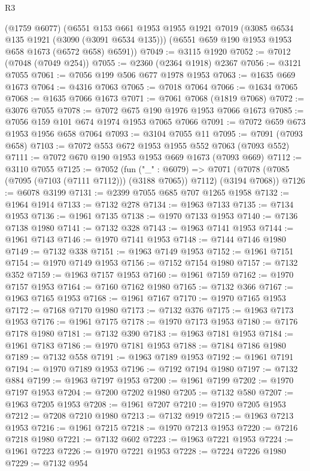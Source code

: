 \begin{lexlean}{R3}
\begin{coremodule}
    (@1759 @6077)
    (@6551
      @153
      @661
      @1953
      @1955
      @1921
      @7019
      (@3085 @6534 @135 @1921 (@3090 (@3091 @6534 @135)))
      (@6551 @659 @190 @1953 @1953 @658 @1673 (@6572 @658) @6591))
@7049 := @3115 @1920
@7052 := @7012 (@7048 (@7049 @254))
@7055 := @2360 (@2364 @1918) @2367
@7056 := @3121 @7055
@7061 := @7056 @199 @506 @677 @1978 @1953
@7063 := @1635 @669 @1673
@7064 := @4316 @7063
@7065 := @7018 @7064
@7066 := @1634 @7065
@7068 := @1635 @7066 @1673
@7071 := @7061 @7068 (@1819 @7068)
@7072 := @3076 @7055
@7078 := @7072 @675 @190 @1976 @1953 @7066 @1673
@7085 := @7056 @159 @101 @674 @1974 @1953 @7065 @7066
@7091 := @7072 @659 @673 @1953 @1956 @658 @7064
@7093 := @3104 @7055 @11
@7095 := @7091 (@7093 @658)
@7103 := @7072 @553 @672 @1953 @1955 @552 @7063 (@7093 @552)
@7111 := @7072 @670 @190 @1953 @1953 @669 @1673 (@7093 @669)
@7112 := @3110 @7055
@7125 := @7052
    (fun ("_" : @6079) =>
    @7071 (@7078 (@7085 (@7095 (@7103 (@7111 @7112))) (@3188 @7065)) @7112) (@3194 @7068))
@7126 := @6078 @3199
@7131 := @2399 @7055 @685 @707 @1265 @1958
@7132 := @1964 @1914
@7133 := @7132 @278
@7134 := @1963 @7133
@7135 := @7134 @1953
@7136 := @1961 @7135
@7138 := @1970 @7133 @1953
@7140 := @7136 @7138 @1980
@7141 := @7132 @328
@7143 := @1963 @7141 @1953
@7144 := @1961 @7143
@7146 := @1970 @7141 @1953
@7148 := @7144 @7146 @1980
@7149 := @7132 @338
@7151 := @1963 @7149 @1953
@7152 := @1961 @7151
@7154 := @1970 @7149 @1953
@7156 := @7152 @7154 @1980
@7157 := @7132 @352
@7159 := @1963 @7157 @1953
@7160 := @1961 @7159
@7162 := @1970 @7157 @1953
@7164 := @7160 @7162 @1980
@7165 := @7132 @366
@7167 := @1963 @7165 @1953
@7168 := @1961 @7167
@7170 := @1970 @7165 @1953
@7172 := @7168 @7170 @1980
@7173 := @7132 @376
@7175 := @1963 @7173 @1953
@7176 := @1961 @7175
@7178 := @1970 @7173 @1953
@7180 := @7176 @7178 @1980
@7181 := @7132 @390
@7183 := @1963 @7181 @1953
@7184 := @1961 @7183
@7186 := @1970 @7181 @1953
@7188 := @7184 @7186 @1980
@7189 := @7132 @558
@7191 := @1963 @7189 @1953
@7192 := @1961 @7191
@7194 := @1970 @7189 @1953
@7196 := @7192 @7194 @1980
@7197 := @7132 @884
@7199 := @1963 @7197 @1953
@7200 := @1961 @7199
@7202 := @1970 @7197 @1953
@7204 := @7200 @7202 @1980
@7205 := @7132 @580
@7207 := @1963 @7205 @1953
@7208 := @1961 @7207
@7210 := @1970 @7205 @1953
@7212 := @7208 @7210 @1980
@7213 := @7132 @919
@7215 := @1963 @7213 @1953
@7216 := @1961 @7215
@7218 := @1970 @7213 @1953
@7220 := @7216 @7218 @1980
@7221 := @7132 @602
@7223 := @1963 @7221 @1953
@7224 := @1961 @7223
@7226 := @1970 @7221 @1953
@7228 := @7224 @7226 @1980
@7229 := @7132 @954

\end{coremodule}
\end{lexlean}
